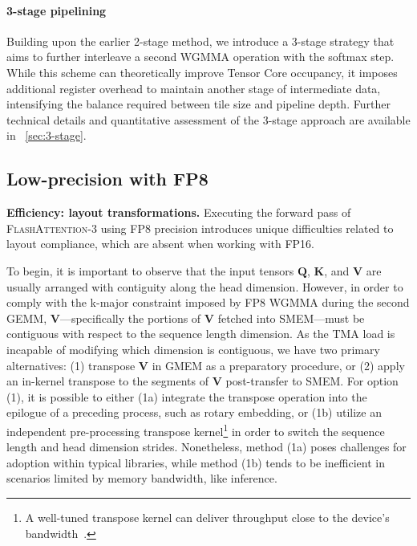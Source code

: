\begin{enumerate}
\paragraph{3-stage pipelining} Building upon the earlier 2-stage method, we introduce a 3-stage strategy that aims to further interleave a second WGMMA operation with the softmax step. While this scheme can theoretically improve Tensor Core occupancy, it imposes additional register overhead to maintain another stage of intermediate data, intensifying the balance required between tile size and pipeline depth. Further technical details and quantitative assessment of the 3-stage approach are available in ~\cref{sec:3-stage}.

\subsection{Low-precision with FP8}
\label{sec:algofp8}

\textbf{Efficiency: layout transformations.} Executing the forward pass of \textsc{FlashAttention-3} using FP8 precision introduces unique difficulties related to layout compliance, which are absent when working with FP16.

To begin, it is important to observe that the input tensors $\mathbf{Q}$, $\mathbf{K}$, and $\mathbf{V}$ are usually arranged with contiguity along the head dimension. However, in order to comply with the k-major constraint imposed by FP8 WGMMA during the second GEMM, $\mathbf{V}$—specifically the portions of $\mathbf{V}$ fetched into SMEM—must be contiguous with respect to the sequence length dimension. As the TMA load is incapable of modifying which dimension is contiguous, we have two primary alternatives: (1) transpose $\mathbf{V}$ in GMEM as a preparatory procedure, or (2) apply an in-kernel transpose to the segments of $\mathbf{V}$ post-transfer to SMEM. For option (1), it is possible to either (1a) integrate the transpose operation into the epilogue of a preceding process, such as rotary embedding, or (1b) utilize an independent pre-processing transpose kernel\footnote{A well-tuned transpose kernel can deliver throughput close to the device's bandwidth~\citep{colfax_cutlass_transpose_2024}.} in order to switch the sequence length and head dimension strides. Nonetheless, method (1a) poses challenges for adoption within typical libraries, while method (1b) tends to be inefficient in scenarios limited by memory bandwidth, like inference.


\end{enumerate}
